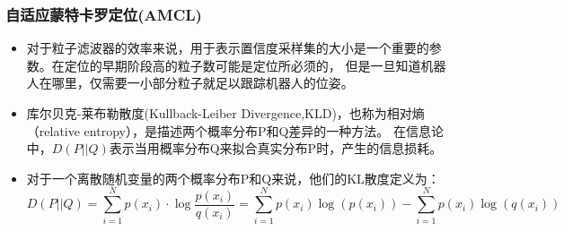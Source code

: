 \begin{comment}
1.这里介绍一种能够实现自动调节粒子数量的算法-库尔贝克-莱布勒散度。

2.熵：

如果对深度学习有了解的话，深度学习的损失函数中有一个交叉熵的概念。
！！交叉熵是深度学习中常用的一个概念。用在损失函数中求目标与预测值之间的差距。
信息论：熵--信息量，
信息量应该和事件发生的概率有关； $I(x_0) = -\log(p(x_0))$
当越不可能的事件发生了，我们获取到的信息量就越大；
！！熵用来表示所有信息量的期望； $H(X) = - \sum_{i=1}^n p(x_i)\log(p(x_i))$

3 相对熵（KL散度)
对于同一个随机变量 x 有两个单独的概率分布 P(x) 和 Q(x)，
我们可以使用 KL 散度（Kullback-Leibler (KL) divergence）来衡量这两个分布的差异

\end{comment}

\begin{frame}
  \frametitle{自适应蒙特卡罗定位(AMCL)}
  \begin{itemize}
    \item 对于粒子滤波器的效率来说，用于表示置信度采样集的大小是一个重要的参数。在定位的早期阶段高的粒子数可能是定位所必须的，
          但是一旦知道机器人在哪里，仅需要一小部分粒子就足以跟踪机器人的位姿。
    \item {\color{red}库尔贝克-莱布勒散度}(Kullback-Leiber Divergence,KLD)，也称为相对熵（relative entropy），是描述两个概率分布P和Q差异的一种方法。
          在信息论中，$D(P||Q)$表示当用概率分布Q来拟合真实分布P时，产生的信息损耗。
    \item 对于一个离散随机变量的两个概率分布P和Q来说，他们的KL散度定义为：
          $$D(P||Q) = 
          \sum_{i=1}^N p(x_i) \cdot \log \frac{p(x_i)}{q(x_i)} = 
          \sum_{i=1}^N p(x_i) \log(p(x_i)) - \sum_{i=1}^N p(x_i)\log(q(x_i))$$
  \end{itemize}
  
\end{frame}

